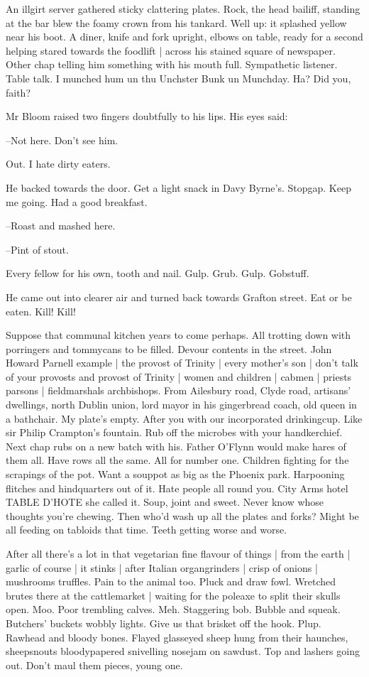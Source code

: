 An illgirt server gathered sticky clattering plates.
Rock, the head bailiff,
standing at the bar blew the foamy crown from his tankard.
Well up:
it splashed yellow near his boot.
A diner, knife and fork upright,
elbows on table,
ready for a second helping stared towards the foodlift |
across his stained square of newspaper.
Other chap telling him something with his mouth full.
Sympathetic listener.
Table talk.
I munched hum un thu Unchster Bunk un Munchday.
Ha?
Did you, faith?

Mr Bloom raised two fingers doubtfully to his lips.
His eyes said:

--Not here.
Don't see him.

Out.
I hate dirty eaters.

He backed towards the door.
Get a light snack in Davy Byrne's.
Stopgap.
Keep me going.
Had a good breakfast.

--Roast and mashed here.

--Pint of stout.

Every fellow for his own, tooth and nail.
Gulp.
Grub.
Gulp.
Gobstuff.

He came out into clearer air and turned back towards Grafton street.
Eat or be eaten.
Kill!
Kill!

Suppose that communal kitchen years to come perhaps.
All trotting down with porringers and tommycans to be filled.
Devour contents in the street.
John Howard Parnell example |
the provost of Trinity |
every mother's
son |
don't talk of your provosts and provost of Trinity |
women and children |
cabmen |
priests parsons |
fieldmarshals archbishops.
From Ailesbury road,
Clyde road,
artisans' dwellings,
north Dublin union,
lord mayor in his gingerbread coach,
old queen in a bathchair.
My plate's empty.
After you with our incorporated drinkingcup.
Like sir Philip Crampton's fountain.
Rub off the microbes with your handkerchief.
Next chap rubs on a new batch with his.
Father O'Flynn would make hares of them all.
Have rows all the same.
All for number one.
Children fighting for the scrapings of the pot.
Want a souppot as big as the Phoenix park.
Harpooning flitches and hindquarters out of it.
Hate people all round you.
City Arms hotel
TABLE D'HOTE
she called it.
Soup, joint and sweet.
Never know whose thoughts you're chewing.
Then who'd wash up all the plates and forks?
Might be all feeding on tabloids that time.
Teeth getting worse and worse.

After all there's a lot in that vegetarian fine flavour of things |
from the earth |
garlic of course |
it stinks |
after Italian organgrinders |
crisp of onions |
mushrooms truffles.
Pain to the animal too.
Pluck and draw fowl.
Wretched brutes there at the cattlemarket |
waiting for the poleaxe to split their skulls open.
Moo.
Poor trembling calves.
Meh.
Staggering bob.
Bubble and squeak.
Butchers' buckets wobbly lights.
Give us that brisket off the hook.
Plup.
Rawhead and bloody bones.
Flayed glasseyed sheep hung from their haunches,
sheepsnouts bloodypapered snivelling nosejam on sawdust.
Top and lashers going out.
Don't maul them pieces, young one.

